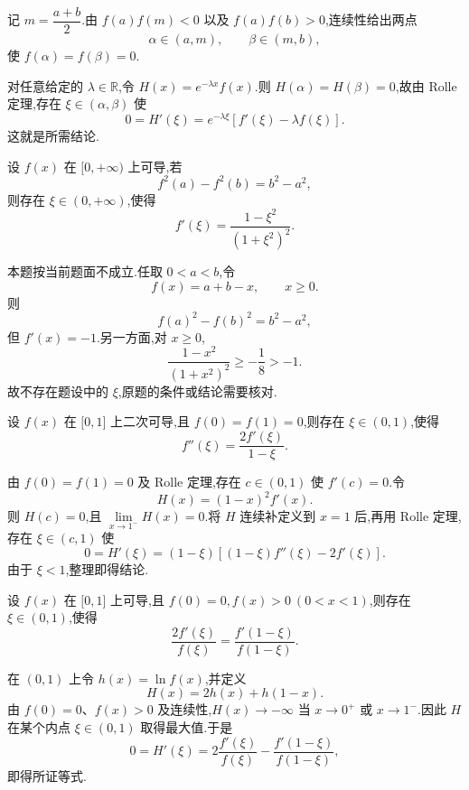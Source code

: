 \begin{solution}
    记 $m=\dfrac{a+b}{2}$.由 $f(a)f(m)<0$ 以及 $f(a)f(b)>0$,连续性给出两点
    \[
        \alpha\in(a,m),
        \qquad
        \beta\in(m,b),
    \]
    使 $f(\alpha)=f(\beta)=0$.

    对任意给定的 $\lambda\in\mathbb{R}$,令 $H(x)=e^{-\lambda x}f(x)$.则 $H(\alpha)=H(\beta)=0$,故由 Rolle 定理,存在 $\xi\in(\alpha,\beta)$ 使
    \[
        0=H'(\xi)=e^{-\lambda\xi}[f'(\xi)-\lambda f(\xi)].
    \]
    这就是所需结论.
\end{solution}

\begin{example}
    设 $f(x)$ 在 $\lbrack 0,+\infty)$ 上可导,若
    \[
        f^2(a)-f^2(b)=b^2-a^2,
    \]
    则存在 $\xi\in(0,+\infty)$,使得
    \[
        f'(\xi)=\dfrac{1-\xi^2}{(1+\xi^2)^2}.
    \]
\end{example}
\exampleblank

\begin{solution}
    本题按当前题面不成立.任取 $0<a<b$,令
    \[
        f(x)=a+b-x,
        \qquad x\geq0.
    \]
    则
    \[
        f(a)^2-f(b)^2=b^2-a^2,
    \]
    但 $f'(x)=-1$.另一方面,对 $x\geq0$,
    \[
        \dfrac{1-x^2}{(1+x^2)^2}\geq-\dfrac{1}{8}>-1.
    \]
    故不存在题设中的 $\xi$,原题的条件或结论需要核对.
\end{solution}

\begin{example}
    设 $f(x)$ 在 $\lbrack 0,1\rbrack$ 上二次可导,且 $f(0)=f(1)=0$,则存在 $\xi\in(0,1)$,使得
    \[
        f''(\xi)=\dfrac{2f'(\xi)}{1-\xi}.
    \]
\end{example}
\exampleblank

\begin{solution}
    由 $f(0)=f(1)=0$ 及 Rolle 定理,存在 $c\in(0,1)$ 使 $f'(c)=0$.令
    \[
        H(x)=(1-x)^2f'(x).
    \]
    则 $H(c)=0$,且 $\lim\limits_{x\to1^-}H(x)=0$.将 $H$ 连续补定义到 $x=1$ 后,再用 Rolle 定理,存在 $\xi\in(c,1)$ 使
    \[
        0=H'(\xi)
        =(1-\xi)[(1-\xi)f''(\xi)-2f'(\xi)].
    \]
    由于 $\xi<1$,整理即得结论.
\end{solution}

\begin{example}
    设 $f(x)$ 在 $\lbrack 0,1\rbrack$ 上可导,且 $f(0)=0,f(x)>0\ (0<x<1)$,则存在 $\xi\in(0,1)$,使得
    \[
        \dfrac{2f'(\xi)}{f(\xi)}
        =\dfrac{f'(1-\xi)}{f(1-\xi)}.
    \]
\end{example}
\exampleblank

\begin{solution}
    在 $(0,1)$ 上令 $h(x)=\ln f(x)$,并定义
    \[
        H(x)=2h(x)+h(1-x).
    \]
    由 $f(0)=0$、$f(x)>0$ 及连续性,$H(x)\to-\infty$ 当 $x\to0^+$ 或 $x\to1^-$.因此 $H$ 在某个内点 $\xi\in(0,1)$ 取得最大值.于是
    \[
        0=H'(\xi)
        =2\dfrac{f'(\xi)}{f(\xi)}
        -\dfrac{f'(1-\xi)}{f(1-\xi)},
    \]
    即得所证等式.
\end{solution}



